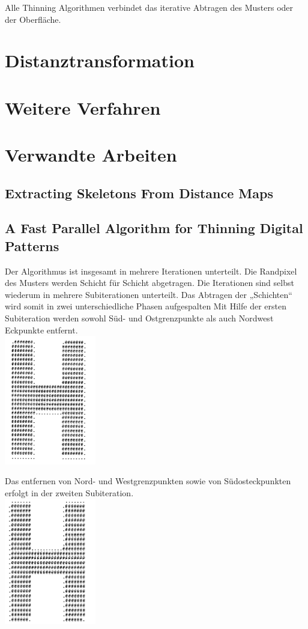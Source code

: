\documentclass[
	12pt,
	a4paper,
	BCOR10mm,
	DIV14,
	listof=totoc,
	bibliography=totoc,
	headsepline
]{scrreprt}
\begin{document}
Alle Thinning Algorithmen verbindet das iterative Abtragen des Musters oder der Oberfläche.

\section{Distanztransformation}
\section{Weitere Verfahren}
\section{Verwandte Arbeiten}
\subsection{Extracting Skeletons From Distance Maps}
\subsection{A Fast Parallel Algorithm for Thinning Digital Patterns} 


Der Algorithmus ist insgesamt in mehrere Iterationen unterteilt. Die Randpixel des Musters werden Schicht für Schicht abgetragen. Die Iterationen sind selbst wiederum in mehrere Subiterationen unterteilt. Das Abtragen der „Schichten“ wird somit in zwei unterschiedliche Phasen aufgespalten
Mit Hilfe der ersten Subiteration werden sowohl Süd- und Ostgrenzpunkte als auch Nordwest Eckpunkte entfernt. \\


\includegraphics[width=4cm]{Res/SuedOst.png}


Das entfernen von Nord- und Westgrenzpunkten sowie von Südosteckpunkten erfolgt in der zweiten Subiteration.\\

\includegraphics[width=4cm]{Res/NordWest.png}
\end{document}
